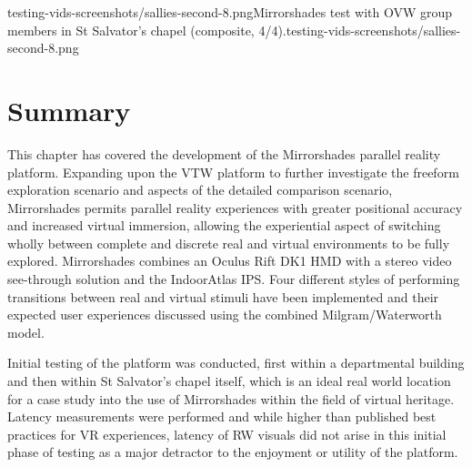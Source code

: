        {testing-vids-screenshots/sallies-second-8.png}{Mirrorshades test with OVW group members in St Salvator's chapel (composite, 4/4).}{testing-vids-screenshots/sallies-second-8.png}


\section{Summary}
This chapter has covered the development of the Mirrorshades parallel reality platform. Expanding upon the VTW platform to further investigate the freeform exploration scenario and aspects of the detailed comparison scenario, Mirrorshades permits parallel reality experiences with greater positional accuracy and increased virtual immersion, allowing the experiential aspect of switching wholly between complete and discrete real and virtual environments to be fully explored. Mirrorshades combines an Oculus Rift DK1 HMD with a stereo video see-through solution and the IndoorAtlas IPS. Four different styles of performing transitions between real and virtual stimuli have been implemented and their expected user experiences discussed using the combined Milgram/Waterworth model.

Initial testing of the platform was conducted, first within a departmental building and then within St Salvator's chapel itself, which is an ideal real world location for a case study into the use of Mirrorshades within the field of virtual heritage. Latency measurements were performed and while higher than published best practices for VR experiences, latency of RW visuals did not arise in this initial phase of testing as a major detractor to the enjoyment or utility of the platform.


